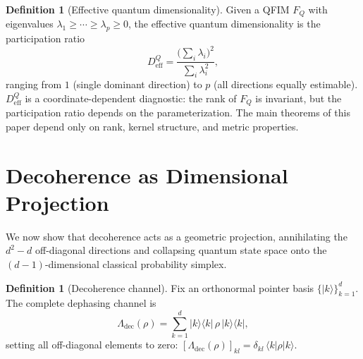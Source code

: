 \documentclass[12pt,a4paper]{article}
\theoremstyle{definition}
\newtheorem{definition}[theorem]{Definition}
\theoremstyle{remark}
\begin{document}
\begin{definition}[Effective quantum dimensionality]
\label{def:deff}
Given a QFIM $F_Q$ with eigenvalues $\lambda_1 \geq \cdots \geq \lambda_p \geq 0$, the effective quantum dimensionality is the participation ratio
\begin{equation}
\label{eq:deff}
D_{\mathrm{eff}}^Q = \frac{\bigl(\sum_i \lambda_i\bigr)^2}{\sum_i \lambda_i^2},
\end{equation}
ranging from $1$ (single dominant direction) to $p$ (all directions equally estimable). $D_{\mathrm{eff}}^Q$ is a coordinate-dependent diagnostic: the rank of $F_Q$ is invariant, but the participation ratio depends on the parameterization. The main theorems of this paper depend only on rank, kernel structure, and metric properties.
\end{definition}

\section{Decoherence as Dimensional Projection}
\label{sec:decoherence}

We now show that decoherence acts as a geometric projection, annihilating the $d^2 - d$ off-diagonal directions and collapsing quantum state space onto the $(d{-}1)$-dimensional classical probability simplex.

\begin{definition}[Decoherence channel]
\label{def:decoherence-channel}
Fix an orthonormal pointer basis $\{|k\rangle\}_{k=1}^d$. The complete dephasing channel is
\begin{equation}
\label{eq:dephasing}
\Lambda_{\mathrm{dec}}(\rho) = \sum_{k=1}^d |k\rangle\langle k|\, \rho\, |k\rangle\langle k|,
\end{equation}
setting all off-diagonal elements to zero: $[\Lambda_{\mathrm{dec}}(\rho)]_{kl} = \delta_{kl}\, \langle k|\rho|k\rangle$.
\end{definition}
\end{document}
